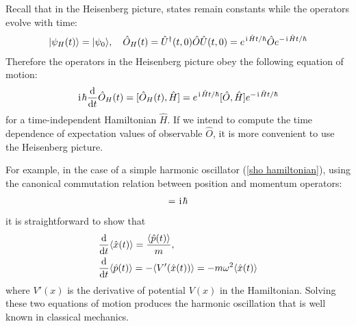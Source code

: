Recall that in the Heisenberg picture, states remain constants while the operators evolve with time:
\begin{align}
    |{\psi_H(t)}\rangle=|{\psi_0}\rangle,~~~\hat O_H(t)=\hat U^\dagger(t,0)\hat O\hat U(t,0)=e^{\hspace{1pt}\mathrm{i}\hspace{1pt}\hat Ht/\hbar}\hat Oe^{-\hspace{1pt}\mathrm{i}\hspace{1pt}\hat Ht/\hbar}
\end{align}
Therefore the operators in the Heisenberg picture obey the following equation of motion:
\begin{align}
    \hspace{1pt}\mathrm{i}\hspace{1pt}\hbar\frac{\mathrm{d}{}}{\mathrm{d} t}\hat O_H(t)=[\hat O_H(t),\hat H]=e^{\hspace{1pt}\mathrm{i}\hspace{1pt}\hat Ht/\hbar}[\hat O,\hat H]e^{-\hspace{1pt}\mathrm{i}\hspace{1pt}\hat Ht/\hbar}
\end{align}
for a time-independent Hamiltonian $\hat H$. If we intend to compute the time dependence of expectation values of observable $\hat O$, it is more convenient to use the Heisenberg picture. 

For example, in the case of a simple harmonic oscillator (\ref{sho hamiltonian}), using the canonical commutation relation between position and momentum operators:
\begin{align}
    [\hat x,\hat p]=\imth\hbar
\end{align}
it is straightforward to show that
\begin{align}
    &\frac{\mathrm{d}{}}{\mathrm{d} t}\langle{\hat x(t)}\rangle=\frac{\langle{\hat p(t)}\rangle}{m},\\
    &\frac{\mathrm{d}{}}{\mathrm{d} t}\langle{\hat p(t)}\rangle=-{\langle{V'(\hat x(t))}\rangle}=-m\omega^2\langle{\hat x(t)}\rangle
\end{align}
where $V'(x)$ is the derivative of potential $V(x)$ in the Hamiltonian. Solving these two equations of motion produces the harmonic oscillation that is well known in classical mechanics. 


